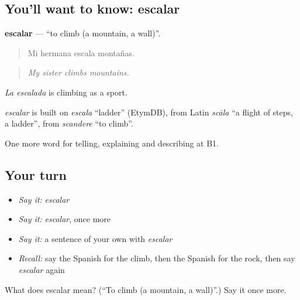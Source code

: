 \subsection*{You'll want to know: escalar}
\textbf{escalar} — \textquotedblleft{}to climb (a mountain, a wall)\textquotedblright{}.

\begin{quote}
Mi hermana escala montañas.
\end{quote}

\begin{quote}
\emph{My sister climbs mountains.}
\end{quote}

\emph{La escalada} is climbing as a sport.

\begin{cousinweb}
\emph{escalar} is built on \emph{escala} \textquotedblleft{}ladder\textquotedblright{} (EtymDB), from Latin \emph{scāla} \textquotedblleft{}a flight of steps, a ladder\textquotedblright{}, from \emph{scandere} \textquotedblleft{}to climb\textquotedblright{}.
\end{cousinweb}

\begin{grammarlens}[title={What you've built}]
One more word for telling, explaining and describing at B1.
\end{grammarlens}

\subsection*{Your turn}
\begin{itemize}
\raggedright
  \item \emph{Say it:} \emph{escalar}
  \item \emph{Say it:} \emph{escalar}, once more
  \item \emph{Say it:} a sentence of your own with \emph{escalar}
  \item \emph{Recall:} say the Spanish for the climb, then the Spanish for the rock, then say \emph{escalar} again
\end{itemize}

\begin{tcolorbox}[breakable,colback=teal!4,colframe=teal!35!black,title={Before you move on}]
What does escalar mean? (\textquotedblleft{}To climb (a mountain, a wall)\textquotedblright{}.) Say it once more.
\end{tcolorbox}
